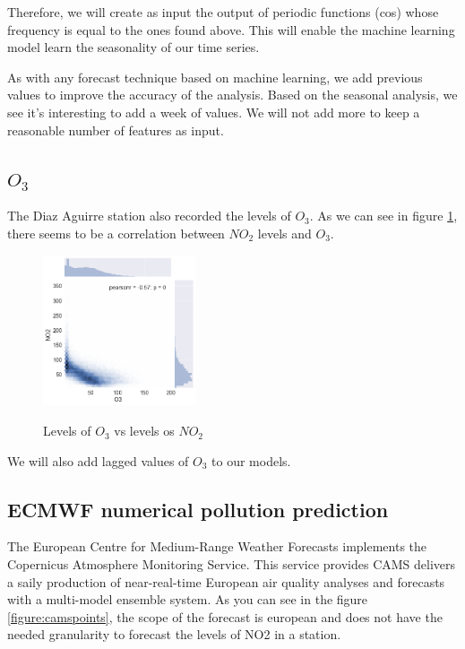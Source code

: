 \documentclass[a4paper,twocolumn,5p]{elsarticle}
\begin{document}
Therefore, we will create as input the output of periodic functions (cos) whose frequency is equal to the ones found 
above. This will enable the machine learning model learn the seasonality of our time series.

As with any forecast technique based on machine learning, we add previous values to improve the accuracy 
of the analysis. Based on the seasonal analysis, we see it's interesting to add a week of values. We will not 
add more to keep a reasonable number of features as input.

\subsection{$O_3$}

The Diaz Aguirre station also recorded the levels of $O_3$. As we can see in figure \ref{figure:no2vso3},
there seems to be a correlation between $NO_2$ levels and $O_3$.

\begin{figure}
  \centering
  \includegraphics[width=0.4\textwidth]{no2vso3}
  \label{figure:no2vso3}
  \caption{Levels of $O_3$ vs levels os $NO_2$}
\end{figure}

We will also add lagged values of $O_3$ to our models.

\subsection{ECMWF numerical pollution prediction}
\label{sec:ecmwf-numer-poll}

The European Centre for Medium-Range Weather Forecasts implements the Copernicus Atmosphere Monitoring Service.
This service provides CAMS delivers a saily production of near-real-time European air quality analyses and forecasts 
with a multi-model ensemble system. 
As you can see in the figure \ref{figure:camspoints}, the scope of the forecast is european and does not have the needed granularity to forecast 
the levels of NO2 in a station.
\end{document}
